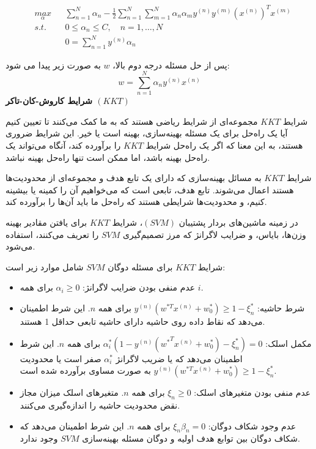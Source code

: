 \documentclass[12pt]{article}
\begin{document}
\begin{equation}
\begin{aligned}
& \underset{\alpha}{max}
& & \sum_{n=1}^{N} \alpha_n - \frac{1}{2} \sum_{n=1}^{N} \sum_{m=1}^{N} 
  \alpha_n \alpha_m y^{(n)} y^{(m)} (x^{(n)})^T x^{(m)} \\
& s.t.
& & 0 \leq \alpha_n \leq C, \quad n = 1,\ldots,N \\
&&& 0 = \sum_{n=1}^N y^{(n)}\alpha_n
\end{aligned}
\end{equation}


 پس از حل مسئله درجه دوم بالا، $w$ به صورت زیر پیدا می شود:
$$w = \sum_{n=1}^{N}\alpha_n y^{(n)} x^{(n)} $$
\textbf{
شرایط کاروش-کان-تاکر $(KKT)$
}


شرایط $KKT$ مجموعه‌ای از شرایط ریاضی هستند که به ما کمک می‌کنند تا تعیین کنیم آیا یک راه‌حل برای یک مسئله بهینه‌سازی، بهینه است یا خیر. این شرایط ضروری هستند، به این معنا که اگر یک راه‌حل شرایط $KKT$ را برآورده کند، آنگاه می‌تواند یک راه‌حل بهینه باشد، اما ممکن است تنها راه‌حل بهینه نباشد.

شرایط $KKT$ به مسائل بهینه‌سازی که دارای یک تابع هدف و مجموعه‌ای از محدودیت‌ها هستند اعمال می‌شوند. تابع هدف، تابعی است که می‌خواهیم آن را کمینه یا بیشینه کنیم، و محدودیت‌ها شرایطی هستند که راه‌حل ما باید آن‌ها را برآورده کند.

در زمینه ماشین‌های بردار پشتیبان $(SVM)$، شرایط $KKT$ برای یافتن مقادیر بهینه وزن‌ها، بایاس، و ضرایب لاگرانژ که مرز تصمیم‌گیری $SVM$ را تعریف می‌کنند، استفاده می‌شود.


شرایط $KKT$ برای مسئله دوگان $SVM$ شامل موارد زیر است:

\begin{itemize}
    \item عدم منفی بودن ضرایب لاگرانژ: $\alpha_i \geq 0$ برای همه $i$.
    \item شرط حاشیه: $y^{(n)} (w^{*T}x^{(n)}+w_{0}^{*}) \geq 1 - \xi_n^*$ برای همه $n$. این شرط اطمینان می‌دهد که نقاط داده روی حاشیه دارای حاشیه تابعی حداقل 1 هستند.
    \item مکمل اسلک: $\alpha_i^* (1 - y^{(n)} ({w^{*}}^{T}x^{(n)}+w_{0}^{*}) - \xi_n^*) = 0$ برای همه $n$. این شرط اطمینان می‌دهد که یا ضریب لاگرانژ $\alpha_i^*$ صفر است یا محدودیت $y^{(n)} (w^{*T}x^{(n)}+w_{0}^{*}) \geq 1 - \xi_n^*$ به صورت مساوی برآورده شده است.
    \item عدم منفی بودن متغیرهای اسلک: $\xi_n \geq 0$ برای همه $n$. متغیرهای اسلک میزان مجاز نقض محدودیت حاشیه را اندازه‌گیری می‌کنند.
    \item عدم وجود شکاف دوگان: $\xi_n \beta_n = 0$ برای همه $n$. این شرط اطمینان می‌دهد که شکاف دوگان بین توابع هدف اولیه و دوگان مسئله بهینه‌سازی $SVM$ وجود ندارد.
\end{itemize}
\end{document}
